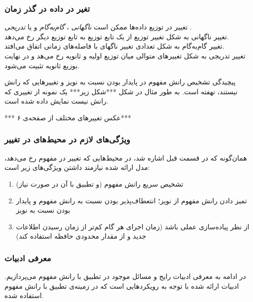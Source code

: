\subsubsection{
تغیر در داده در گذر زمان
}
تغییر در توزیع داده‌ها ممکن است 
\textit{
ناگهانی
}، 
\textit{
گام‌به‌گام
} 
و یا 
\textit{
تدریجی
}.\\
تغییر ناگهانی به شکل تغییر توزیع از یک تابع توزیع به تابع توزیع دیگر رخ می‌دهد.\\
تغییر گام‌به‌گام به شکل تعدادی تغییر ناگهای با فاصله‌های زمانی اتفاق می‌افتد.\\
تغییر تدریجی به شکل تغییرهای متوالی میان توزیع اولیه و ثانویه رخ می‌هد و در نهایت بوزیع ثانویه تثبیت می‌شود.

پیچیدگی تشخیص رانش مفهوم در پایدار بودن نسبت به نویز و تغییرهایی که رانش نیستند، نهفته است. به طور مثال در شکل ***شکل زیر*** یک نمونه از تغییری که رانش نیست نمایش داده شده است.

*** عکس تغییرهای مختلف از صفحه‌ی ۶***



\subsubsection{
ویژگی‌های لازم در محیط‌های در تغییر
}
همان‌گونه که در قسمت قبل اشاره شد، در محیط‌هایی که تغییر در مفهوم رخ می‌دهد، مدل ارائه شده نیازمند داشتن ویژگی‌های زیر است:
\begin{enumerate}
\item 
تشخیص سریع رانش مفهوم (و تطبیق با آن در صورت نیاز)

\item 
تمیز دادن رانش مفهوم از نویز؛ انتعطاف‌پذیر بودن نسبت به رانش مفهوم و پایدار بودن نسبت به نویز

\item 
از نظر پیاده‌سازی عملی باشد (زمان اجرای هر گام کم‌تر از زمان رسیدن اطلاعات جدید و از مقدار محدودی حافظه استفاده کند)

\end{enumerate}


\subsubsection{
معرفی ادبیات
}
در ادامه به معرفی ادبیات رایج و مسائل موجود در تطبیق با رانش مفهوم می‌پردازیم. ادبیات ارائه شده با توجه به رویکردهایی است که در زمینه‌ی تطبیق با رانش مفهوم استفاده شده.

